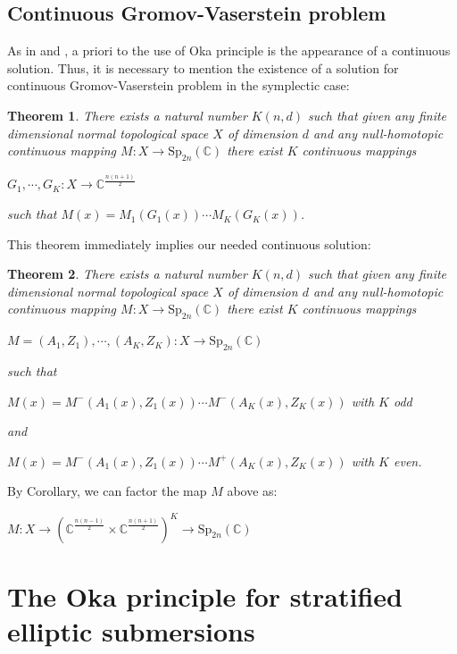 \documentclass[10pt]{amsart}
\newtheorem{theo}{Theorem}[section]
\theoremstyle{remark}
\newtheorem{defi}[theo]{Definition}
\begin{document}
\subsection{Continuous Gromov-Vaserstein problem}
As in \cite{KI} and \cite{Scho}, a priori to the use of Oka principle is the appearance of a continuous solution. Thus, it is necessary to mention the existence of a solution for continuous Gromov-Vaserstein problem in the symplectic case:
\begin{theo}
  There exists a natural number $K(n, d)$ such that given any finite dimensional normal topological space $X$ of dimension $d$ and any null-homotopic continuous mapping $M : X \longrightarrow \mathrm{Sp}_{2n}(\mathbb{C})$ there exist $K$ continuous mappings
\begin{center}
 $G_1, \cdots, G_K : X \longrightarrow \mathbb{C}^{\frac{n(n+1)}{2}}$   
\end{center}
such that
$M(x) = M_1(G_1(x))\cdots M_K(G_K(x))$.
\end{theo}
This theorem immediately implies our needed continuous solution:
\begin{theo}\label{Cont-GV}
    There exists a natural number $K(n, d)$ such that given any finite dimensional normal topological space $X$ of dimension $d$ and any null-homotopic continuous mapping $M : X \longrightarrow \mathrm{Sp}_{2n}(\mathbb{C})$ there exist $K$ continuous mappings
    \begin{center}
       $M =(A_1,Z_1), \cdots, (A_K,Z_K) : X \longrightarrow \mathrm{Sp}_{2n}(\mathbb{C})$ 
    \end{center}
    such that 
    \begin{center}
        $M(x) =   M^-(A_1(x),Z_1(x))\cdots M^-(A_K(x),Z_K(x))$ with $K$ odd 
    \end{center}
    and
    \begin{center}
         $M(x) =   M^-(A_1(x),Z_1(x))\cdots M^+(A_K(x),Z_K(x))$ with $K$ even. 
    \end{center}
\end{theo}
By Corollary, we can factor the map $M$ above as: 
\begin{center}
$M: X \longrightarrow (\mathbb{C}^{\frac{n(n-1)}{2}} \times \mathbb{C}^{\frac{n(n+1)}{2}})^K \longrightarrow \mathrm{Sp}_{2n}(\mathbb{C})$   
\end{center}
\fi

\section{The Oka principle for stratified elliptic submersions}
\end{document}
